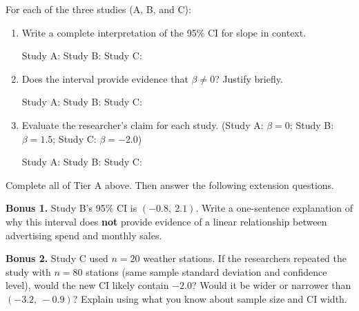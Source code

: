 \documentclass[10pt]{article}
\begin{document}
\begin{tcolorbox}[colback=white, colframe=black!40,
    title=\textbf{Tier A --- Approaching Proficiency},
    fonttitle=\bfseries, arc=2mm, left=3mm, right=3mm, top=2mm, bottom=2mm]

For each of the three studies (A, B, and C):

\begin{enumerate}[label=\alph*.]

  \item Write a complete interpretation of the 95\% CI for slope in context.

        Study A: 
        Study B: 
        Study C: 

  \item Does the interval provide evidence that $\beta \ne 0$? Justify briefly.

        Study A: 
        Study B: 
        Study C: 

  \item Evaluate the researcher's claim for each study.
        (Study A: $\beta = 0$; \quad Study B: $\beta = 1.5$; \quad Study C: $\beta = -2.0$)

        Study A: 
        Study B: 
        Study C: 

\end{enumerate}
\end{tcolorbox}

\begin{tcolorbox}[colback=white, colframe=black!40,
    title=\textbf{Tier E --- Extension},
    fonttitle=\bfseries, arc=2mm, left=3mm, right=3mm, top=2mm, bottom=2mm]

Complete all of Tier A above. Then answer the following extension questions.

\textbf{Bonus 1.} Study B's 95\% CI is $(-0.8,\ 2.1)$. Write a one-sentence explanation
of why this interval does \textbf{not} provide evidence of a linear relationship between
advertising spend and monthly sales.


\textbf{Bonus 2.} Study C used $n = 20$ weather stations. If the researchers repeated
the study with $n = 80$ stations (same sample standard deviation and confidence level),
would the new CI likely contain $-2.0$? Would it be wider or narrower than $(-3.2,\ -0.9)$?
Explain using what you know about sample size and CI width.


\end{tcolorbox}
\end{document}
